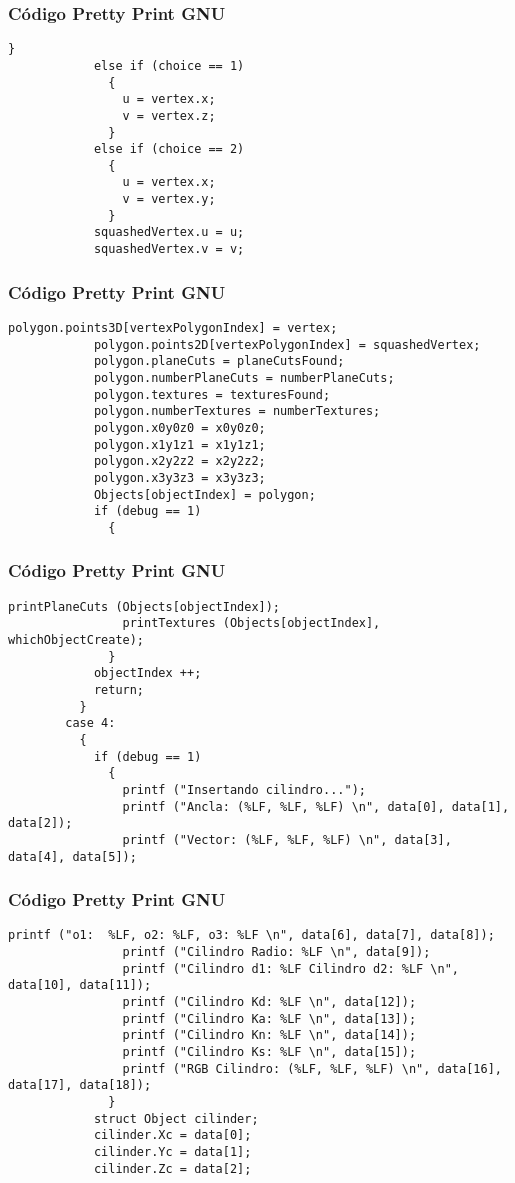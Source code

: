 \documentclass{beamer}
\begin{document}
\begin{frame}[fragile]
\frametitle{C\'odigo Pretty Print GNU}
\begin{lstlisting}[style=CStyle]
              }
            else if (choice == 1)
              {
                u = vertex.x;
                v = vertex.z;
              }
            else if (choice == 2)
              {
                u = vertex.x;
                v = vertex.y;
              }
            squashedVertex.u = u;
            squashedVertex.v = v;
\end{lstlisting}
\end{frame}
\begin{frame}[fragile]
\frametitle{C\'odigo Pretty Print GNU}
\begin{lstlisting}[style=CStyle]
            polygon.points3D[vertexPolygonIndex] = vertex;
            polygon.points2D[vertexPolygonIndex] = squashedVertex;
            polygon.planeCuts = planeCutsFound;
            polygon.numberPlaneCuts = numberPlaneCuts;
            polygon.textures = texturesFound;
            polygon.numberTextures = numberTextures;
            polygon.x0y0z0 = x0y0z0;
            polygon.x1y1z1 = x1y1z1;
            polygon.x2y2z2 = x2y2z2;
            polygon.x3y3z3 = x3y3z3;
            Objects[objectIndex] = polygon;
            if (debug == 1)
              {
                \end{lstlisting}
\end{frame}
\begin{frame}[fragile]
\frametitle{C\'odigo Pretty Print GNU}
\begin{lstlisting}[style=CStyle]
                printPlaneCuts (Objects[objectIndex]);
                printTextures (Objects[objectIndex], whichObjectCreate);
              }
            objectIndex ++;
            return;
          }
        case 4:
          {
            if (debug == 1)
              {
                printf ("Insertando cilindro...");
                printf ("Ancla: (%LF, %LF, %LF) \n", data[0], data[1], data[2]);
                printf ("Vector: (%LF, %LF, %LF) \n", data[3], data[4], data[5]);
\end{lstlisting}
\end{frame}
\begin{frame}[fragile]
\frametitle{C\'odigo Pretty Print GNU}
\begin{lstlisting}[style=CStyle]
                printf ("o1:  %LF, o2: %LF, o3: %LF \n", data[6], data[7], data[8]);
                printf ("Cilindro Radio: %LF \n", data[9]);
                printf ("Cilindro d1: %LF Cilindro d2: %LF \n", data[10], data[11]);
                printf ("Cilindro Kd: %LF \n", data[12]);
                printf ("Cilindro Ka: %LF \n", data[13]);
                printf ("Cilindro Kn: %LF \n", data[14]);
                printf ("Cilindro Ks: %LF \n", data[15]);
                printf ("RGB Cilindro: (%LF, %LF, %LF) \n", data[16], data[17], data[18]);
              }
            struct Object cilinder;
            cilinder.Xc = data[0];
            cilinder.Yc = data[1];
            cilinder.Zc = data[2];
\end{lstlisting}
\end{frame}
\end{document}
